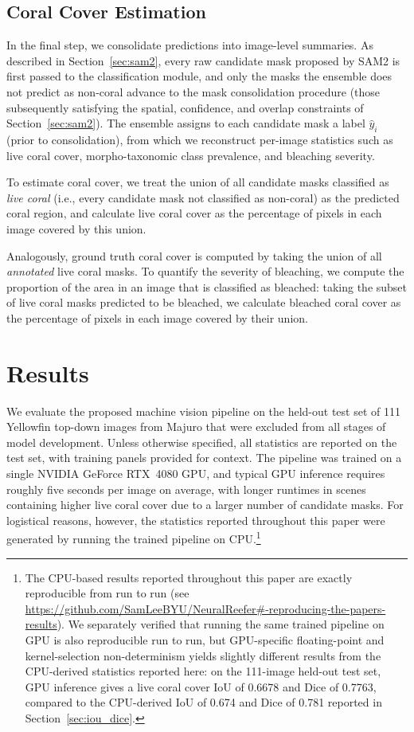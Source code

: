 \documentclass[11pt]{elsarticle}
\begin{document}
\subsection{Coral Cover Estimation} \label{sec:reconstruct}

In the final step, we consolidate predictions into image-level summaries. As described in Section~\ref{sec:sam2}, every raw candidate mask proposed by SAM2 is first passed to the classification module, and only the masks the ensemble does not predict as non-coral advance to the mask consolidation procedure (those subsequently satisfying the spatial, confidence, and overlap constraints of Section~\ref{sec:sam2}). The ensemble assigns to each candidate mask a label $\hat{y}_i$ (prior to consolidation), from which we reconstruct per-image statistics such as live coral cover, morpho-taxonomic class prevalence, and bleaching severity.

To estimate coral cover, we treat the union of all candidate masks classified as \emph{live coral} (i.e., every candidate mask not classified as non-coral) as the predicted coral region, and calculate live coral cover as the percentage of pixels in each image covered by this union.

Analogously, ground truth coral cover is computed by taking the union of all \emph{annotated} live coral masks.
To quantify the severity of bleaching, we compute the proportion of the area in an image that is classified as bleached: taking the subset of live coral masks predicted to be bleached, we calculate bleached coral cover as the percentage of pixels in each image covered by their union.

\section{Results}
\label{sec:results}

We evaluate the proposed machine vision pipeline on the held-out test set of 111 Yellowfin top-down images from Majuro that were excluded from all stages of model development. Unless otherwise specified, all statistics are reported on the test set, with training panels provided for context. The pipeline was trained on a single NVIDIA GeForce RTX~4080 GPU, and typical GPU inference requires roughly five seconds per image on average, with longer runtimes in scenes containing higher live coral cover due to a larger number of candidate masks. For logistical reasons, however, the statistics reported throughout this paper were generated by running the trained pipeline on CPU.\footnote{The CPU-based results reported throughout this paper are exactly reproducible from run to run (see \href{https://github.com/SamLeeBYU/NeuralReefer\#-reproducing-the-papers-results}{https://github.com/SamLeeBYU/NeuralReefer\#-reproducing-the-papers-results}). We separately verified that running the same trained pipeline on GPU is also reproducible run to run, but GPU-specific floating-point and kernel-selection non-determinism yields slightly different results from the CPU-derived statistics reported here: on the 111-image held-out test set, GPU inference gives a live coral cover IoU of 0.6678 and Dice of 0.7763, compared to the CPU-derived IoU of 0.674 and Dice of 0.781 reported in Section~\ref{sec:iou_dice}.}
\end{document}
